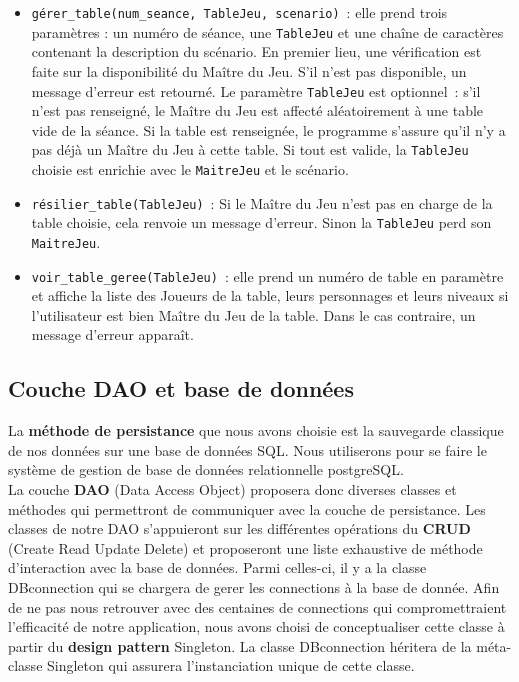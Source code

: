 \documentclass[11pt]{article}
\begin{document}
\begin{itemize}[label=, font=\small]
    \item \texttt{gérer\_table(num\_seance, TableJeu, scenario)}~: elle prend trois paramètres : un numéro de séance, une \texttt{TableJeu} et une chaîne de caractères contenant la description du scénario. En premier lieu, une vérification est faite sur la disponibilité du Maître du Jeu. S'il n'est pas disponible, un message d'erreur est retourné. Le paramètre \texttt{TableJeu} est optionnel~: s'il n'est pas renseigné, le Maître du Jeu est affecté aléatoirement à une table vide de la séance. Si la table est renseignée, le programme s'assure qu'il n'y a pas déjà un Maître du Jeu à cette table. Si tout est valide, la \texttt{TableJeu} choisie est enrichie avec le \texttt{MaitreJeu} et le scénario.
    
    \item \texttt{résilier\_table(TableJeu)}~: Si le Maître du Jeu n'est pas en charge de la table choisie, cela renvoie un message d'erreur. Sinon la \texttt{TableJeu} perd son \texttt{MaitreJeu}.
    
    \item \texttt{voir\_table\_geree(TableJeu)}~: elle prend un numéro de table en paramètre et affiche la liste des Joueurs de la table, leurs personnages et leurs niveaux si l'utilisateur est bien Maître du Jeu de la table. Dans le cas contraire, un message d'erreur apparaît.
\end{itemize}





\subsection{Couche DAO et base de données}

La \textbf{méthode de persistance} que nous avons choisie est la sauvegarde classique de nos données sur une base de données SQL. Nous utiliserons pour se faire le système de gestion de base de données relationnelle postgreSQL.\\

La couche \textbf{DAO} (Data Access Object) proposera donc diverses classes et méthodes qui permettront de communiquer avec la couche de persistance. Les classes de notre DAO s'appuieront sur les différentes opérations du \textbf{CRUD} (Create Read Update Delete) et proposeront une liste exhaustive de méthode d'interaction avec la base de données. Parmi celles-ci, il y a la classe DBconnection qui se chargera de gerer les connections à la base de donnée. Afin de ne pas nous retrouver avec des centaines de connections qui compromettraient l'efficacité de notre application, nous avons choisi de conceptualiser cette classe à partir du \textbf{design pattern} Singleton. La classe DBconnection héritera de la méta-classe Singleton qui assurera l'instanciation unique de cette classe.
\end{document}
